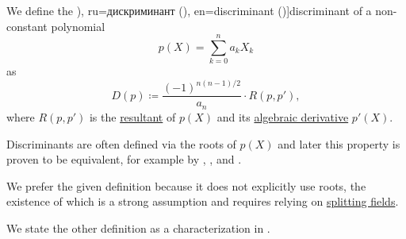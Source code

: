 \begin{definition}\label{def:discriminant}
  We define the \term[bg=дискриминанта (\cite[215]{Обрешков1962ВисшаАлгебра}), ru=дискриминант (\cite[141]{Винберг2014Алгебра}), en=discriminant (\cite[223]{Rotman2015AlgebraPart1})]{discriminant} of a non-constant polynomial
  \begin{equation*}
    p(X) = \sum_{k=0}^n a_k X_k
  \end{equation*}
  as
  \begin{equation*}
    D(p) \coloneqq \frac {(-1)^{n(n-1)/2}} {a_n} \cdot R(p, p'),
  \end{equation*}
  where \( R(p, p') \) is the \hyperref[def:resultant]{resultant} of \( p(X) \) and its \hyperref[def:algebraic_derivative]{algebraic derivative} \( p'(X) \).
\end{definition}
\begin{comments}
  \item Discriminants are often defined via the roots of \( p(X) \) and later this property is proven to be equivalent, for example by
  ,
  ,
   and
  .

  We prefer the given definition because it does not explicitly use roots, the existence of which is a strong assumption and requires relying on \hyperref[def:splitting_field]{splitting fields}.

  We state the other definition as a characterization in .
\end{comments}

